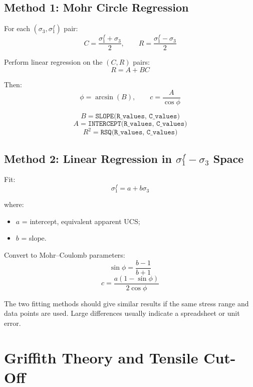 \documentclass[a4paper,12pt]{article}
\begin{document}
\subsection{Method 1: Mohr Circle Regression}

For each \((\sigma_3,\sigma_1^f)\) pair:
\[
C = \frac{\sigma_1^f+\sigma_3}{2},
\qquad
R = \frac{\sigma_1^f-\sigma_3}{2}
\]

Perform linear regression on the \((C,R)\) pairs:
\[
R = A + B C
\]

Then:
\[
\phi = \arcsin(B),
\qquad
c = \frac{A}{\cos\phi}
\]

\begin{calcbox}
\[
B = \texttt{SLOPE(R\_values, C\_values)}
\]
\[
A = \texttt{INTERCEPT(R\_values, C\_values)}
\]
\[
R^2 = \texttt{RSQ(R\_values, C\_values)}
\]
\end{calcbox}

\subsection{Method 2: Linear Regression in \(\sigma_1^f-\sigma_3\) Space}

Fit:
\[
\sigma_1^f = a + b\sigma_3
\]

where:
\begin{itemize}
    \item \(a\) = intercept, equivalent apparent UCS;
    \item \(b\) = slope.
\end{itemize}

Convert to Mohr--Coulomb parameters:
\[
\sin\phi = \frac{b-1}{b+1}
\]
\[
c =
\frac{a(1-\sin\phi)}
{2\cos\phi}
\]

\begin{notebox}
The two fitting methods should give similar results if the same stress range and data
points are used. Large differences usually indicate a spreadsheet or unit error.
\end{notebox}

\section{Griffith Theory and Tensile Cut-Off}
\end{document}
